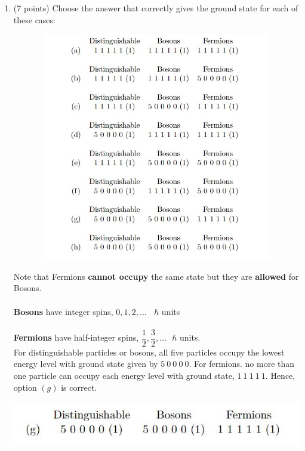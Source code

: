 \documentclass[fleqn]{article}
\begin{document}
  \begin{enumerate}
    \item (7 points) Choose the answer that correctly gives the ground state for each of these cases:
    \begin{center}
      \includegraphics[height=10cm, width=15cm]{1.JPG}
    \end{center}

      \textcolor{hwColor}{
        Note that Fermions \textbf{cannot occupy} the same state but they are
        \textbf{allowed} for Bosons.
        \\
        \\
        \textbf{Bosons} have integer spins, $0,1,2,... ~~~~ \hbar$ units
        \\
        \\
        \textbf{Fermions} have half-integer spins, $\dfrac{1}{2}, \dfrac{3}{2},... ~~~ \hbar$ units.
        \\
        For distinguishable particles or bosons, all five particles occupy the lowest 
        energy level with ground state given by $5 ~ 0 ~ 0 ~ 0 ~ 0$. For fermions. no more than 
        one particle can occupy each energy level with ground state, $1 ~ 1 ~ 1 ~ 1 ~ 1$. Hence, option 
        $(g)$ is correct.
      }
      \begin{center}
        \includegraphics[height=2cm, width=13cm]{Answer1.JPG}
      \end{center}


\end{enumerate}
\end{document}

